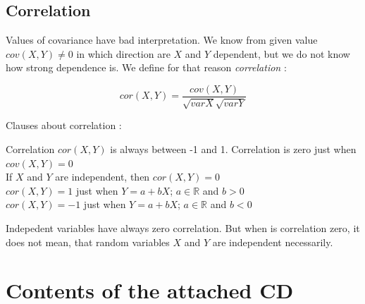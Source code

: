 \documentclass[11pt,twoside,a4paper]{book}
\begin{document}
\section{Correlation}

Values of covariance have bad interpretation. We know from given value
$cov(X,Y)\neq0$ in which direction are $X$ and $Y$ dependent, but we do not know
how strong dependence is. We define for that reason \textit{correlation}
\cite{kulich:stat}:

$$cor(X,Y)=\frac{cov(X,Y)}{\sqrt{var X}\sqrt{var Y}}$$ 

Clauses about correlation \cite{kulich:stat}:

\begin{center}
Correlation $cor(X,Y)$ is always between -1 and 1. Correlation is zero just when
$cov(X,Y)=0$\\
If $X$ and $Y$ are independent, then $cor(X,Y)=0$\\
$cor(X,Y)=1$ just when $Y=a+bX$; $a\in\mathbb{R}$ and $b>0$\\
$cor(X,Y)=-1$ just when $Y=a+bX$; $a\in\mathbb{R}$ and $b<0$\\
\end{center}

Indepedent variables have always zero correlation. But when is correlation
zero, it does not mean, that random variables $X$ and $Y$ are independent
necessarily.

\chapter{Contents of the attached CD}


\end{document}
